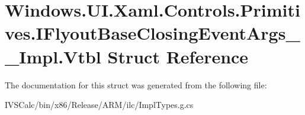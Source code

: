 \hypertarget{struct_windows_1_1_u_i_1_1_xaml_1_1_controls_1_1_primitives_1_1_i_flyout_base_closing_event_args_____impl_1_1_vtbl}{}\section{Windows.\+U\+I.\+Xaml.\+Controls.\+Primitives.\+I\+Flyout\+Base\+Closing\+Event\+Args\+\_\+\+\_\+\+Impl.\+Vtbl Struct Reference}
\label{struct_windows_1_1_u_i_1_1_xaml_1_1_controls_1_1_primitives_1_1_i_flyout_base_closing_event_args_____impl_1_1_vtbl}


The documentation for this struct was generated from the following file\+:\begin{DoxyCompactItemize}
\item 
I\+V\+S\+Calc/bin/x86/\+Release/\+A\+R\+M/ilc/Impl\+Types.\+g.\+cs\end{DoxyCompactItemize}
